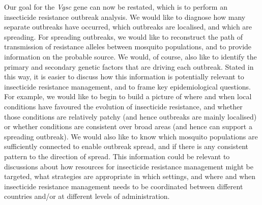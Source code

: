 \documentclass[a4paper,11pt,abstracton,hidelinks]{scrartcl}
\begin{document}
%
Our goal for the \textit{Vgsc} gene can now be restated, which is to perform an insecticide resistance outbreak analysis.
%
We would like to diagnose how many separate outbreaks have occurred, which outbreaks are localised, and which are spreading.
%
For spreading outbreaks, we would like to reconstruct the path of transmission of resistance alleles between mosquito populations, and to provide information on the probable source. 
%
We would, of course, also like to identify the primary and secondary genetic factors that are driving each outbreak.
%
Stated in this way, it is easier to discuss how this information is potentially relevant to insecticide resistance management, and to frame key epidemiological questions.
%
For example, we would like to begin to build a picture of where and when local conditions have favoured the evolution of insecticide resistance, and whether those conditions are relatively patchy (and hence outbreaks are mainly localised) or whether conditions are consistent over broad areas (and hence can support a spreading outbreak).
%
We would also like to know which mosquito populations are sufficiently connected to enable outbreak spread, and if there is any consistent pattern to the direction of spread.
%
This information could be relevant to discussions about how resources for insecticide resistance management might be targeted, what strategies are appropriate in which settings, and where and when insecticide resistance management needs to be coordinated between different countries and/or at different levels of administration.
%
\end{document}
